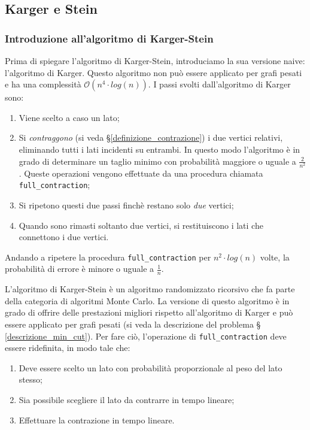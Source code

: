 \subsection{Karger e Stein}
\label{karger_stein_section}

\subsubsection{Introduzione all'algoritmo di Karger-Stein}
Prima di spiegare l'algoritmo di Karger-Stein, introduciamo la sua versione naive: 
l'algoritmo di Karger. Questo algoritmo non può essere applicato per grafi pesati 
e ha una complessità $\mathcal{O}(n^4 \cdot log(n))$. I passi svolti dall'algoritmo 
di Karger sono:
\begin{enumerate}
    \item Viene scelto a caso un lato;
    \item Si \textit{contraggono} (si veda \S \ref{definizione_contrazione}) i due vertici 
    relativi, eliminando tutti i lati incidenti su entrambi. In questo modo l'algoritmo 
    è in grado di determinare un taglio minimo con probabilità maggiore o uguale a 
    $\frac{2}{n^2}$. Queste operazioni vengono effettuate da una procedura chiamata 
    \verb|full_contraction|;
    \item Si ripetono questi due passi finchè restano solo \textit{due} vertici;
    \item Quando sono rimasti soltanto due vertici, si restituiscono i lati che  
    connettono i due vertici.
\end{enumerate}
Andando a ripetere la procedura \verb|full_contraction| per $n^2 \cdot log(n)$ volte, la probabilità di errore è minore o uguale a $\frac{1}{n}$.

L'algoritmo di Karger-Stein è un algoritmo randomizzato ricorsivo che fa parte della 
categoria di algoritmi Monte Carlo. La versione di questo algoritmo è in grado di 
offrire delle prestazioni migliori rispetto all'algoritmo di Karger e può essere 
applicato per grafi pesati (si veda la descrizione del problema \S
\ref{descrizione_min_cut}). Per fare ciò, l'operazione di \verb|full_contraction| 
deve essere ridefinita, in modo tale che:
\begin{enumerate}
    \item Deve essere scelto un lato con probabilità proporzionale al peso del lato 
    stesso;
    \item Sia possibile scegliere il lato da contrarre in tempo lineare;
    \item Effettuare la contrazione in tempo lineare.
\end{enumerate}

